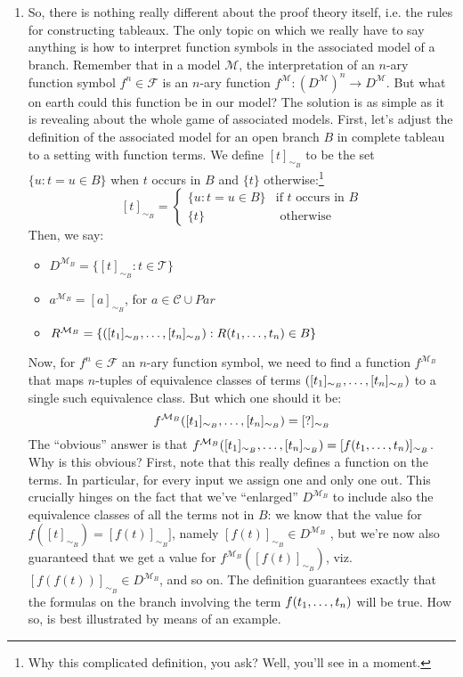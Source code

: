 \begin{enumerate}[\thesection.1]
	\item So, there is nothing really different about the proof theory itself, i.e. the rules for constructing tableaux. The only topic on which we really have to say anything is how to interpret function symbols in the associated model of a branch. Remember that in a model $\mathcal{M}$, the interpretation of an $n$-ary function symbol $f^n\in\mathcal{F}$ is an $n$-ary function $f^\mathcal{M}:(D^\mathcal{M})^n\to D^\mathcal{M}$. But what on earth could this function be in our model? The solution is as simple as it is revealing about the whole game of associated models. First, let's adjust the definition of the associated model for an open branch $B$ in complete tableau to a setting with function terms. We define $[t]_{\sim_B}$ to be the set $\{u:t=u\in B\}$ when $t$ occurs in $B$ and $\{t\}$ otherwise:\footnote{Why this complicated definition, you ask? Well, you'll see in a moment.} \[[t]_{\sim_B}=\begin{cases} \{u:t=u\in B\} &\text{if }t\text{ occurs in }B\\
	\{t\} &\text{ otherwise}\end{cases}\]
	Then, we say:
		\begin{itemize}
		
			\item $D^{\mathcal{M}_B}=\{[t]_{\sim_B}:t\in\mathcal{T}\}$
			
			\item $a^{\mathcal{M}_B}=[a]_{\sim_B}$, for $a\in \mathcal{C}\cup Par$
			
			\item $R^{\mathcal{M}_B}=\{([t_1]_{\sim_B}, \mathellipsis, [t_n]_{\sim_B}): R(t_1, \mathellipsis, t_n)\in B\}$

		\end{itemize}
Now, for $f^n\in\mathcal{F}$ an $n$-ary function symbol, we need to find a function $f^{\mathcal{M}_B}$ that maps $n$-tuples of equivalence classes of terms $([t_1]_{\sim_B},\mathellipsis, [t_n]_{\sim_B})$ to a single such equivalence class. But which one should it be: \[f^{\mathcal{M}_B}([t_1]_{\sim_B},\mathellipsis, [t_n]_{\sim_B})=[?]_{\sim_B}\] The ``obvious'' answer is that $f^{\mathcal{M}_B}([t_1]_{\sim_B},\mathellipsis, [t_n]_{\sim_B})=[f(t_1, \mathellipsis, t_n)]_{\sim_B}$. Why is this obvious? First, note that this really defines a function on the terms. In particular, for every input we assign one and only one out. This crucially hinges on the fact that we've ``enlarged'' $D^{\mathcal{M}_B}$ to include also the equivalence classes of all the terms not in $B$: we know that the value for $f([t]_{\sim_B})=[f(t)]_{\sim_B}]$, namely $[f(t)]_{\sim_B}\in D^{\mathcal{M}_B}$ , but we're now also guaranteed that we get a value for $f^{\mathcal{M}_B}([f(t)]_{\sim_B})$, viz. $[f(f(t))]_{\sim_B}\in D^{\mathcal{M}_B}$, and so on. The definition guarantees exactly that the formulas on the branch involving the term $f(t_1, \mathellipsis, t_n)$ will be true. How so, is best illustrated by means of an example.


\end{enumerate}
